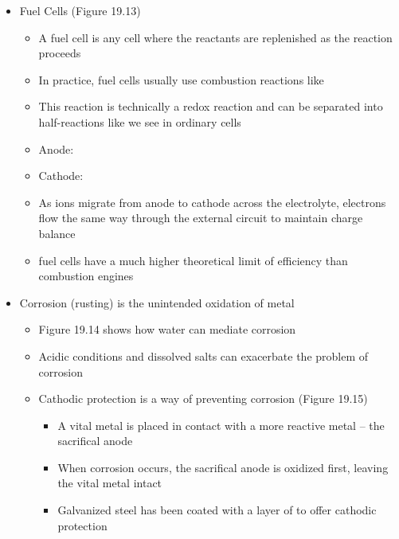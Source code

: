 \documentclass[12pt, openany, letterpaper]{memoir}
\begin{document}
\begin{itemize}
\begin{itemize}
	\end{itemize}
	\item Fuel Cells (Figure 19.13)
	\begin{itemize}
		\item A fuel cell is any cell where the reactants are replenished as the reaction proceeds
		\item In practice, fuel cells usually use combustion reactions like 
		\item This reaction is technically a redox reaction and can be separated into half-reactions like we see in ordinary cells
		\item Anode: 
		\item Cathode: 
		\item As  ions migrate from anode to cathode across the electrolyte, electrons flow the same way through the external circuit to maintain charge balance
		\item {} fuel cells have a much higher theoretical limit of efficiency than  combustion engines
	\end{itemize}
	\item Corrosion (rusting) is the unintended oxidation of metal
	\begin{itemize}
		\item Figure 19.14 shows how water can mediate corrosion
		\item Acidic conditions and dissolved salts can exacerbate the problem of corrosion
		\item Cathodic protection is a way of preventing corrosion (Figure 19.15)
		\begin{itemize}
			\item A vital metal is placed in contact with a more reactive metal -- the sacrifical anode
			\item When corrosion occurs, the sacrifical anode is oxidized first, leaving the vital metal intact
			\item Galvanized steel has been coated with a layer of  to offer cathodic protection
		\end{itemize}
	\end{itemize}
\end{itemize}
\end{document}
